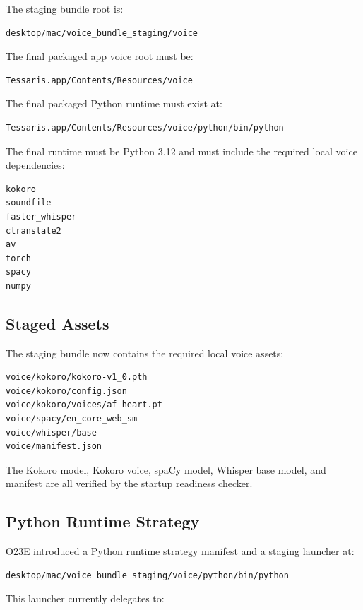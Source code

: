 The staging bundle root is:

\begin{verbatim}
desktop/mac/voice_bundle_staging/voice
\end{verbatim}

The final packaged app voice root must be:

\begin{verbatim}
Tessaris.app/Contents/Resources/voice
\end{verbatim}

The final packaged Python runtime must exist at:

\begin{verbatim}
Tessaris.app/Contents/Resources/voice/python/bin/python
\end{verbatim}

The final runtime must be Python 3.12 and must include the required local voice dependencies:

\begin{verbatim}
kokoro
soundfile
faster_whisper
ctranslate2
av
torch
spacy
numpy
\end{verbatim}

\subsection{Staged Assets}

The staging bundle now contains the required local voice assets:

\begin{verbatim}
voice/kokoro/kokoro-v1_0.pth
voice/kokoro/config.json
voice/kokoro/voices/af_heart.pt
voice/spacy/en_core_web_sm
voice/whisper/base
voice/manifest.json
\end{verbatim}

The Kokoro model, Kokoro voice, spaCy model, Whisper base model, and manifest are all verified by the startup readiness checker.

\subsection{Python Runtime Strategy}

O23E introduced a Python runtime strategy manifest and a staging launcher at:

\begin{verbatim}
desktop/mac/voice_bundle_staging/voice/python/bin/python
\end{verbatim}

This launcher currently delegates to:

